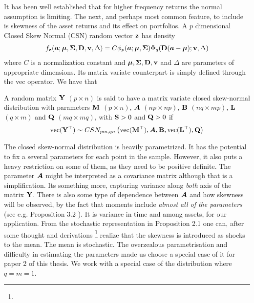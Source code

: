 \documentclass[oneside]{book}\usepackage{knitr}
\begin{document}
It has been well established that for higher frequency returns the normal assumption is limiting. 
The next, and perhaps most common feature, to include is skewness of the asset returns and its effect on portfolios. 
A $p$ dimensional Closed Skew Normal (CSN) random vector $\mathbf{z}$ has density
\begin{equation}
  f_{\mathbf{z}}(\mbox{\boldmath$a$}; \mbox{\boldmath$\mu$}, \mathbf{\Sigma}, \mathbf{D}, \mathbf{v}, \Delta) = C \phi_p(\mbox{\boldmath$a$}; \mbox{\boldmath$\mu$}, \mathbf{\Sigma}) \Phi_q(\mathbf{D}(\mbox{\boldmath$a$}-\mbox{\boldmath$\mu$}); \mathbf{v}, \Delta)
\end{equation}
where $C$ is a normalization constant and $\mbox{\boldmath$\mu$}, \mathbf{\Sigma}, \mathbf{D}, \mathbf{v}$ and $\Delta$ are parameters of appropriate dimensions. Its matrix variate counterpart is simply defined through the vec operator. We have that
\begin{definition}
  A random matrix $\mathbf{Y}$ $(p \times n)$ is said to have a matrix variate closed skew-normal distribution with parameters $\mathbf{M}$ $(p \times n)$, $\mbox{\boldmath$A$}$ $(np \times np)$, $\mathbf{B}$ $(nq \times mp)$, $\mathbf{L}$ $(q \times m)$ and $\mathbf{Q}$ $(mq \times mq)$, with $\mathbf{S} > 0$ and $\mathbf{Q}>0$ if
  \begin{equation}
    \operatorname{vec}(\mathbf{Y}^\top) \sim CSN_{pm, qn}\left(\operatorname{vec}(\mathbf{M}^\top), \mbox{\boldmath$A$}, \mathbf{B}, \operatorname{vec}(\mathbf{L}^\top), \mathbf{Q}\right)
  \end{equation}
\end{definition} 
The closed skew-normal distribution is heavily parametrized. 
It has the potential to fix a several parameters for each point in the sample.
However, it also puts a heavy restriction on some of them, as they need to be positive definite.
The parameter $\mbox{\boldmath$A$}$ might be interpreted as a covariance matrix although that is a simplification.
Its something more, capturing variance along \textit{both} axis of the matrix $\mathbf{Y}$.
There is also some type of dependence between $\mbox{\boldmath$A$}$ and how skewness will be observed, by the fact that moments include \textit{almost all of the parameters} (see e.g. Proposition 3.2 \citet{dominguez2007matrix}).
It is variance in time and among assets, for our application.
From the stochastic representation in Proposition 2.1 \citet{dominguez2007matrix} one can, after some thought and derivations
\footnote{}
realize that the skewness is introduced as shocks to the mean.
The mean is stochastic. 
The overzealous parametrisation and difficulty in estimating the parameters made us choose a special case of it for paper 2 of this thesis.
We work with a special case of the distribution where $q=m=1$.
\end{document}
